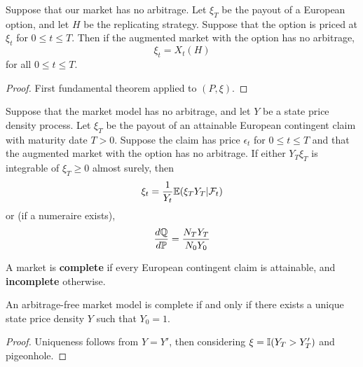 \begin{thm}
  \label{sec:pric-hedg-cont-3}
  Suppose that our market has no arbitrage.  Let $\xi_{T}$ be the
  payout of a European option, and let $H$ be the replicating strategy.
  Suppose that the option is priced at $\xi_{t}$ for $0 \leq t \leq
  T$.  Then if the augmented market with the option has no arbitrage,
  \begin{equation}
    \label{eq:7}
    \xi_{t} = X_{t}(H)
  \end{equation} for all $0 \leq t \leq T$.
\end{thm}

\begin{proof}
  First fundamental theorem applied to $(P, \xi)$.
\end{proof}

\begin{thm}
  \label{sec:pric-hedg-cont-4}
  Suppose that the market model has no arbitrage, and let $Y$ be a
  state price density process. Let $\xi_{T}$ be the payout of an
  attainable European contingent claim with maturity date $T > 0$.
  Suppose the claim has price $\epsilon_{t}$ for $0 \leq t \leq T$ and
  that the augmented market with the option has no arbitrage.  If
  either $Y_{T} \xi_{T}$ is integrable of $\xi_{T} \geq 0$ almost
  surely, then
  \begin{align}
    \label{eq:8}
    \xi_{t} = \frac{1}{Y_{t}} \E{\xi_{T} Y_{T} | \mathcal{F}_{t}}
  \end{align} or (if a numeraire exists),
  \begin{align}
    \label{eq:9}
    \frac{d\Q}{d\Prob} = \frac{N_{T} Y_{T}}{N_{0} Y_{0}}
  \end{align}
\end{thm}

\begin{defn}
  \label{sec:pric-hedg-cont-5}
  A market is \textbf{complete} if every European contingent claim is
  attainable, and \textbf{incomplete} otherwise.
\end{defn}

\begin{thm}
  \label{sec:pric-hedg-cont-6}
  An arbitrage-free market model is complete if and only if there
  exists a unique state price density $Y$ such that $Y_{0} = 1$.
\end{thm}

\begin{proof}
  Uniqueness follows from $Y = Y'$, then considering $\xi = \I{Y_{T} >
  Y'_{T}}$ and pigeonhole.
\end{proof}

